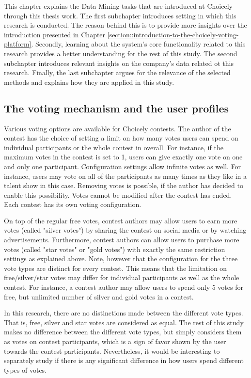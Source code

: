 This chapter explains the Data Mining tasks that are introduced at Choicely through this thesis work. The first subchapter introduces setting in which this research is conducted. The reason behind this is to provide more insights over the introduction presented in Chapter \ref{section::introduction-to-the-choicely-voting-platform}. Secondly, learning about the system's core functionality related to this research provides a better understanding for the rest of this study. The second subchapter introduces relevant insights on the company's data related ot this research. Finally, the last subchapter argues for the relevance of the selected methods and explains how they are applied in this study. 

\subsection{The voting mechanism and the user profiles}
Various voting options are available for Choicely contests. The author of the contest has the choice of setting a limit on how many votes users can spend on individual participants or the whole contest in overall. For instance, if the maximum votes in the contest is set to 1, users can give exactly one vote on one and only one participant. Configuration settings allow infinite votes as well. For instance, users may vote on all of the participants as many times as they like in a talent show in this case. Removing votes is possible, if the author has decided to enable this possibility. Votes cannot be modified after the contest has ended. Each contest has its own voting configuration. 
    
On top of the regular free votes, contest authors may allow users to earn more votes (called "silver votes") by sharing the contest on social media or by watching advertisements. Furthermore, contest authors can allow users to purchase more votes (called "star votes" or "gold votes") with exactly the same restriction settings as explained above. Note, however that the configuration for the three vote types are distinct for every contest. This means that the limitation on free/silver/star votes may differ for individual participants as well as the whole contest. For instance, a contest author may allow users to spend only 5 votes for free, but unlimited number of silver and gold votes in a contest. 

In this research, there are no distinctions made between the different vote types. That is, free, silver and star votes are considered as equal. The rest of this study makes no difference between the different vote types, but simply considers them as votes on contest participants, which is a sign of favor shown by the user towards the contest participants. Nevertheless, it would be interesting to separately study if there is any significant difference in how users spend different types of votes. 

